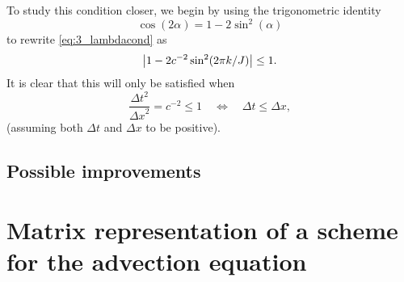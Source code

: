 \documentclass[11pt,letter, swedish, english
]{article}
\newcommand{\Dx}{\ensuremath{\Delta{x}}}
\newcommand{\Dt}{\ensuremath{\Delta{t}}}
\begin{document}
To study this condition closer, we begin by using the trigonometric
identity
\begin{equation}
\cos(2\alpha)=1-2\sin^2(\alpha)
\end{equation}
to rewrite \eqref{eq:3_lambdacond} as
\begin{equation}
\abs{1-2c^{-2}\sin^2(2\pi k/J)}\le1.
\end{equation}
It is clear that this will only be satisfied when
\begin{equation}
\frac{\Dt^2}{\Dx^2}=c^{-2}\le1
\quad\Longleftrightarrow\quad
\Dt\le\Dx,
\end{equation}
(assuming both $\Dt$ and $\Dx$ to be positive).

\subsection{Possible improvements}





\section{Matrix representation of a scheme for the advection equation}
\end{document}
